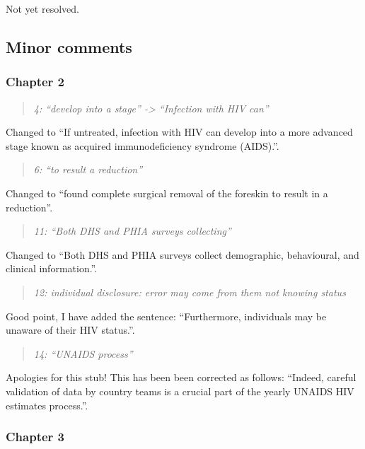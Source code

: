 \documentclass[
  12pt,
]{article}
\begin{document}
Not yet resolved.

\subsection{Minor comments}\label{minor-comments}

\subsubsection{Chapter 2}\label{chapter-2}

\begin{quote}
\emph{4: ``develop into a stage'' -\textgreater{} ``Infection with HIV
can''}
\end{quote}

Changed to ``If untreated, infection with HIV can develop into a more
advanced stage known as acquired immunodeficiency syndrome (AIDS).''.

\begin{quote}
\emph{6: ``to result a reduction''}
\end{quote}

Changed to ``found complete surgical removal of the foreskin to result
in a reduction''.

\begin{quote}
\emph{11: ``Both DHS and PHIA surveys collecting''}
\end{quote}

Changed to ``Both DHS and PHIA surveys collect demographic, behavioural,
and clinical information.''.

\begin{quote}
\emph{12: individual disclosure: error may come from them not knowing
status}
\end{quote}

Good point, I have added the sentence: ``Furthermore, individuals may be
unaware of their HIV status.''.

\begin{quote}
\emph{14: ``UNAIDS process''}
\end{quote}

Apologies for this stub! This has been been corrected as follows:
``Indeed, careful validation of data by country teams is a crucial part
of the yearly UNAIDS HIV estimates process.''.

\subsubsection{Chapter 3}\label{chapter-3}
\end{document}

